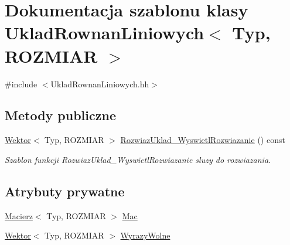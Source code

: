 \hypertarget{class_uklad_rownan_liniowych}{
\section{Dokumentacja szablonu klasy UkladRownanLiniowych$<$ Typ, ROZMIAR $>$}
\label{class_uklad_rownan_liniowych}
}


{\ttfamily \#include $<$UkladRownanLiniowych.hh$>$}

\subsection*{Metody publiczne}
\begin{DoxyCompactItemize}
\item 
\hyperlink{class_wektor}{Wektor}$<$ Typ, ROZMIAR $>$ \hyperlink{class_uklad_rownan_liniowych_a0d78de0a3797294e7d027d7791349637}{RozwiazUklad\_\-WyswietlRozwiazanie} () const 
\begin{DoxyCompactList}\small\item\em Szablon funkcji RozwiazUklad\_\-WyswietlRozwiazanie sluzy do rozwiazania. \item\end{DoxyCompactList}\end{DoxyCompactItemize}
\subsection*{Atrybuty prywatne}
\begin{DoxyCompactItemize}
\item 
\hyperlink{class_macierz}{Macierz}$<$ Typ, ROZMIAR $>$ \hyperlink{class_uklad_rownan_liniowych_a7fc31fd6f0dde9d7b95f136576af9471}{Mac}
\item 
\hyperlink{class_wektor}{Wektor}$<$ Typ, ROZMIAR $>$ \hyperlink{class_uklad_rownan_liniowych_ad6f84eeebcec882a5755868e05395486}{WyrazyWolne}
\end{DoxyCompactItemize}
